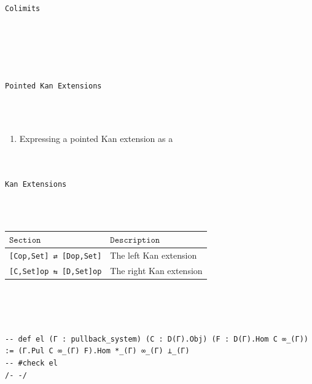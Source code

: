 \documentclass{book}
\theoremstyle{definition}
\newcounter{lcounter}
\renewcommand{\chapter}[1]{
\newpage
{
\Huge 
\begin{center}
\ \\
\ \\
\thispagestyle{empty}
\texttt{#1}
\end{center}}
\ \\
\ \\
}
\begin{document}
\chapter{Colimits}

\chapter{Pointed Kan Extensions}
\begin{enumerate}
\item Expressing a pointed Kan extension as a \end{enumerate}

\chapter{Kan Extensions}
{\footnotesize \begin{center} \begin{tabular}{|| l || l ||}
\hline
$\texttt{Section}$ & $\texttt{Description}$ \\
\hline \hline
\texttt{[Cop,Set] ⇄ [Dop,Set]} & The left Kan extension \\ \hline
\texttt{[C,Set]op ⇆ [D,Set]op} & The right Kan extension \\ \hline

 \end{tabular} \end{center}} \\\
\\\
\begin{center} \begin{tcolorbox}[width=5in,colback={white},title={\begin{center}\texttt{Lean \thelcounter} \addtocounter{lcounter}{1} \end{center}},colbacktitle=Blue,coltitle=black] \begin{verbatim}
-- def el (Γ : pullback_system) (C : D(Γ).Obj) (F : D(Γ).Hom C ∞_(Γ)) := (Γ.Pul C ∞_(Γ) F).Hom *_(Γ) ∞_(Γ) ⊥_(Γ)
-- #check el
/- -/
\end{verbatim} \end{tcolorbox} \end{center}
\end{document}
